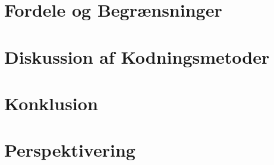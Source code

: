 \section{Fordele og Begrænsninger}

\section{Diskussion af Kodningsmetoder}

\section{Konklusion}

\section{Perspektivering}
